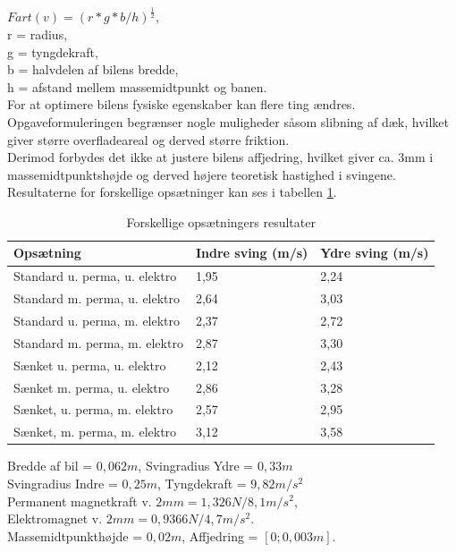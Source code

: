 \( Fart(v) = (r*g*b/h)^\frac{1}{2} \), \\
r = radius,\\
g = tyngdekraft, \\
b = halvdelen af bilens bredde, \\
h = afstand mellem massemidtpunkt og banen. \\

For at optimere bilens fysiske egenskaber kan flere ting ændres. Opgaveformuleringen begrænser nogle muligheder såsom slibning af dæk, hvilket giver større overfladeareal og derved større friktion. \\

Derimod forbydes det ikke at justere bilens affjedring, hvilket giver ca. 3mm i massemidtpunktshøjde og derved højere teoretisk hastighed i svingene. Resultaterne for forskellige opsætninger kan ses i tabellen \ref{forskel_opsaat_result}. \\

\begin{table}[H]
\centering
\begin{tabular}{|l|l|l|}
\hline
Opsætning                      & Indre sving (m/s) & Ydre sving (m/s) \\ \hline
Standard u. perma,  u. elektro & 1,95              & 2,24             \\ \hline
Standard m. perma, u. elektro  & 2,64              & 3,03             \\ \hline
Standard u. perma, m. elektro  & 2,37              & 2,72             \\ \hline
Standard m. perma, m. elektro  & 2,87              & 3,30             \\ \hline
Sænket u. perma, u. elektro    & 2,12              & 2,43             \\ \hline
Sænket m. perma, u. elektro    & 2,86              & 3,28             \\ \hline
Sænket, u. perma, m. elektro   & 2,57              & 2,95             \\ \hline
Sænket, m. perma, m. elektro   & 3,12              & 3,58             \\ \hline
\end{tabular}
\caption{Forskellige opsætningers resultater}
\label{forskel_opsaat_result}
\end{table} 

Bredde af bil = \( 0,062m \), Svingradius Ydre = \( 0,33m \) \\
Svingradius Indre = \( 0,25m \), Tyngdekraft = \( 9,82m/s^2 \) \\
Permanent magnetkraft v. \( 2mm = 1,326N/8,1 m/s^2 \), \\
Elektromagnet v. \( 2mm = 0,9366N/4,7 m/s^2. \) \\  
Massemidtpunkthøjde = \( 0,02m \), Affjedring = \( [0;0,003m]. \) \\

